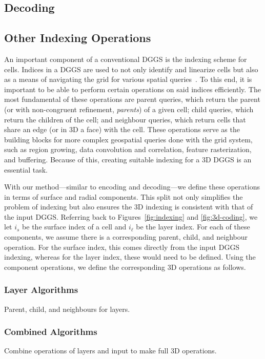 \subsection{Decoding}


\subsection{Other Indexing Operations}
An important component of a conventional DGGS is the indexing scheme for cells.
Indices in a DGGS are used to not only identify and linearize cells but also as a means of navigating the grid for various spatial queries~\cite{alderson2020digital}.
To this end, it is important to be able to perform certain operations on said indices efficiently.
The most fundamental of these operations are parent queries, which return the parent (or with non-congruent refinement, \textit{parents}) of a given cell; child queries, which return the children of the cell; and neighbour queries, which return cells that share an edge (or in 3D a face) with the cell.
These operations serve as the building blocks for more complex geospatial queries done with the grid system, such as region growing, data convolution and correlation, feature rasterization, and buffering.
Because of this, creating suitable indexing for a 3D DGGS is an essential task.


With our method---similar to encoding and decoding---we define these operations in terms of surface and radial components.
This split not only simplifies the problem of indexing but also ensures the 3D indexing is consistent with that of the input DGGS.
Referring back to Figures~\ref{fig:indexing} and \ref{fig:3d-coding}, we let $i_s$ be the surface index of a cell and $i_\ell$ be the layer index.
For each of these components, we assume there is a corresponding parent, child, and neighbour operation.
For the surface index, this comes directly from the input DGGS indexing, whereas for the layer index, these would need to be defined.
Using the component operations, we define the corresponding 3D operations as follows.


\subsubsection{Layer Algorithms}
Parent, child, and neighbours for layers.


\subsubsection{Combined Algorithms}
Combine operations of layers and input to make full 3D operations.


